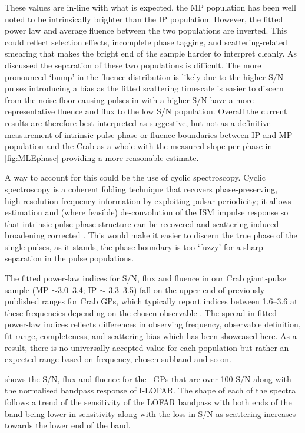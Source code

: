 These values are in-line with what is expected, the MP population has been well noted to be intrinsically brighter than the IP population. However, the fitted power law and average fluence between the two populations are inverted. This could reflect selection effects, incomplete phase tagging, and scattering-related smearing that makes the bright end of the sample harder to interpret cleanly. As discussed the separation of these two populations is difficult. The more pronounced `bump' in the fluence distribution is likely due to the higher S/N pulses introducing a bias as the fitted scattering timescale is easier to discern from the noise floor causing pulses in with a higher S/N have a more representative fluence and flux to the low S/N population. Overall the current results are therefore best interpreted as suggestive, but not as a definitive measurement of intrinsic pulse-phase or fluence boundaries between IP and MP population and the Crab as a whole with the measured slope per phase in \cref{fig:MLEphase} providing a more reasonable estimate. 

A way to account for this could be the use of cyclic spectroscopy. Cyclic spectroscopy is a coherent folding technique that recovers phase‑preserving, high‑resolution frequency information by exploiting pulsar periodicity; it allows estimation and (where feasible) de-convolution of the ISM impulse response so that intrinsic pulse phase structure can be recovered and scattering‑induced broadening corrected \citep{demorest_cyclic_2011, turner_constraining_2026}. This would make it easier to discern the true phase of the single pulses, as it stands, the phase boundary is too `fuzzy' for a sharp separation in the pulse populations. 

The fitted power‑law indices for S/N, flux and fluence in our Crab giant‑pulse sample (MP $\sim$3.0–3.4; IP $\sim$ 3.3–3.5) fall on the upper end of previously published ranges for Crab GPs, which typically report indices between 1.6–3.6 at these frequencies depending on the chosen observable \citep{karuppusamy_giant_2010, karuppusamy_crab_2012, sokolowski_100_2025}. The spread in fitted power-law indices reflects differences in observing frequency, observable definition, fit range, completeness, and scattering bias which has been showcased here. As a result, there is no universally accepted value for each population but rather an expected range based on frequency, chosen subband and so on.  

 shows the S/N, flux and fluence for the \GPhundred~GPs that are over 100 S/N along with the normalised bandpass response of I-LOFAR. The shape of each of the spectra follows a trend of the sensitivity of the LOFAR bandpass \citep{van_haarlem_lofar_2013} with both ends of the band being lower in sensitivity along with the loss in S/N as scattering increases towards the lower end of the band. 




